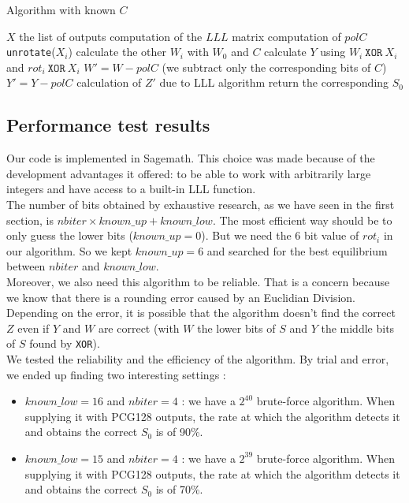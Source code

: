 \documentclass[preprint]{iacrtrans}
\begin{document}
\begin{algorithm}[h!]
\caption{Algorithm with known $C$}
\begin{algorithmic}
\REQUIRE $X$ the list of outputs
\STATE computation of the $LLL$ matrix
\STATE computation of $polC$
        \STATE \texttt{unrotate}($X_i$)
    \ENDFOR
        \STATE calculate the other $W_i$ with $W_0$ and $C$
        \STATE calculate $Y$ using $W_i\ \mathtt{XOR}\ X_i$ and $rot_i\ \mathtt{XOR}\ X_i$
        \STATE $W' = W - polC$ (we subtract only the corresponding bits of $C$)
        \STATE $Y' = Y - polC$
        \STATE calculation of $Z'$ due to LLL algorithm
                \STATE return the corresponding $S_0$
            \ENDIF
        \ENDIF
    \ENDFOR
\ENDFOR
\end{algorithmic}
\end{algorithm}
                
\subsection{Performance test results}
Our code is implemented in Sagemath. This choice was made because of the development advantages it offered: to be able to work with arbitrarily large integers and have access to a built-in LLL function.\\

The number of bits obtained by exhaustive research, as we have seen in the first section, is $nbiter \times known\_up + known\_low$. The most efficient way should be to only guess the lower bits ($known\_up = 0$). But we need the 6 bit value of $rot_i$ in our algorithm. So we kept $known\_up = 6$ and searched for the best equilibrium between $nbiter$ and $known\_low$. \\ 

Moreover, we also need this algorithm to be reliable. That is a concern because we know that there is a rounding error caused by an Euclidian Division. Depending on the error, it is possible that the algorithm doesn't find the correct $Z$ even if $Y$ and $W$ are correct (with $W$ the lower bits of $S$ and $Y$ the middle bits of $S$ found by \texttt{XOR}). \\

We tested the reliability and the efficiency of the algorithm. By trial and error, we ended up finding two interesting settings :
\begin{itemize}
    \item $known\_low = 16$ and $nbiter = 4$ : we have a $2^{40}$ brute-force algorithm. When supplying it with PCG128 outputs, the rate at which the algorithm detects it and obtains the correct $S_0$ is of 90\%.
    \item $known\_low = 15$ and $nbiter = 4$ : we have a $2^{39}$ brute-force algorithm. When supplying it with PCG128 outputs, the rate at which the algorithm detects it and obtains the correct $S_0$ is of 70\%.
\end{itemize}
\end{document}
